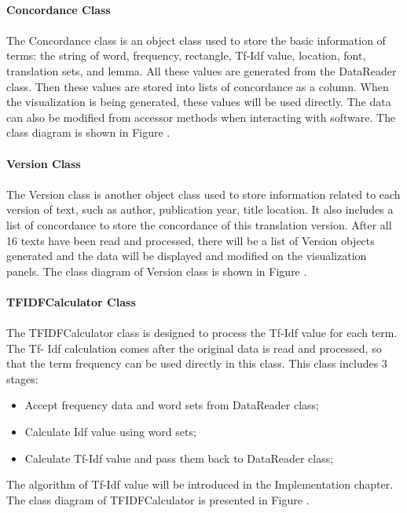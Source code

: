 \paragraph{Concordance Class}

\paragraph[]{}

The Concordance class is an object class used to store the basic information of terms: the string of word, frequency, rectangle, Tf-Idf value, location, font, translation sets, and lemma. All these values are generated from the DataReader class. Then these values are stored into lists of concordance as a column. When the visualization is being generated, these values will be used directly. The data can also be modified from accessor methods when interacting with software. The class diagram is shown in Figure \label{concordance}.

\paragraph{Version Class}

\paragraph[]{}
The Version class is another object class used to store information related to each version of text, such as author, publication year, title location. It also includes a list of concordance to store the concordance of this translation version. After all 16 texts have been read and processed, there will be a list of Version objects generated and the data will be displayed and modified on the visualization panels. The class diagram of Version class is shown in Figure \label{verson}.

\paragraph{TFIDFCalculator Class}

\paragraph[]{}
The TFIDFCalculator class is designed to process the Tf-Idf value for each term. The Tf- Idf calculation comes after the original data is read and processed, so that the term frequency can be used directly in this class. This class includes 3 stages:
\begin{itemize}
	\item \textbf{}Accept frequency data and word sets from DataReader class;
	\item \textbf{}Calculate Idf value using word sets;
	\item \textbf{}Calculate Tf-Idf value and pass them back to DataReader class;
\end{itemize} 
The algorithm of Tf-Idf value will be introduced in the Implementation chapter. The class diagram of TFIDFCalculator is presented in Figure \label{tFiDFCalculator}.

